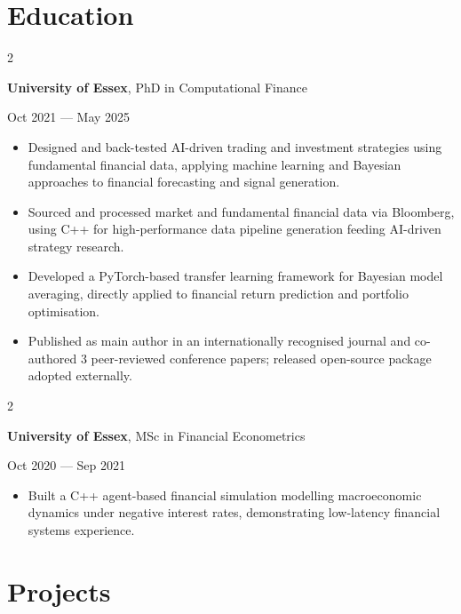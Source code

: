 \documentclass[6pt, letterpaper]{article}
\newenvironment{highlights}{
    \begin{itemize}[
        topsep=0.03 cm,
        parsep=0.03 cm,
        partopsep=0pt,
        itemsep=0pt,
        leftmargin=0 cm + 10pt
    ]
}{
    \end{itemize}
} %
\newenvironment{twocolentry}[2][]{
    \onecolentry
    \def\secondColumn{#2}
    \setcolumnwidth{\fill, 4.5 cm}
    \begin{paracol}{2}
}{
    \switchcolumn \raggedleft \secondColumn
    \end{paracol}
    \endonecolentry
} %
\begin{document}
    \section{Education}

            \begin{twocolentry}{
                Oct 2021 --- May 2025
            }
            \textbf{University of Essex}, PhD in Computational Finance
            \end{twocolentry}

            \begin{highlights}
            \item Designed and back-tested AI-driven trading and investment strategies using fundamental financial data, applying machine learning and Bayesian approaches to financial forecasting and signal generation.
            \item Sourced and processed market and fundamental financial data via Bloomberg, using C++ for high-performance data pipeline generation feeding AI-driven strategy research.
            \item Developed a PyTorch-based transfer learning framework for Bayesian model averaging, directly applied to financial return prediction and portfolio optimisation.
            \item Published as main author in an internationally recognised journal and co-authored 3 peer-reviewed conference papers; released open-source package adopted externally.
            \end{highlights}

            \begin{twocolentry}{
                Oct 2020 --- Sep 2021
            }
            \textbf{University of Essex}, MSc in Financial Econometrics
            \end{twocolentry}

            \begin{highlights}
            \item Built a C++ agent-based financial simulation modelling macroeconomic dynamics under negative interest rates, demonstrating low-latency financial systems experience.
            \end{highlights}

    \section{Projects}
\end{document}
